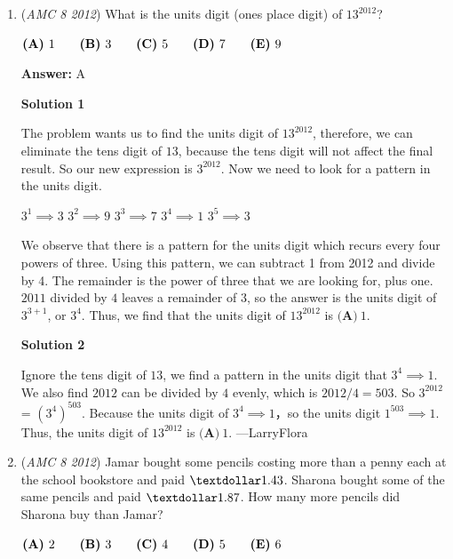 \begin{enumerate}
	\item (\textit{AMC 8 2012}) What is the units digit (ones place digit) of  $13^{2012}$?


 $\textbf{(A)}\hspace{.05in}1\qquad\textbf{(B)}\hspace{.05in}3\qquad\textbf{(C)}\hspace{.05in}5\qquad\textbf{(D)}\hspace{.05in}7\qquad\textbf{(E)}\hspace{.05in}9$

 \textbf{Answer: }A



\textbf{Solution 1}

The problem wants us to find the units digit of $13^{2012}$, therefore, we can eliminate the tens digit of $13$, because the tens digit will not affect the final result. So our new expression is $3^{2012}$. Now we need to look for a pattern in the units digit.

 $3^1 \implies 3$
$3^2 \implies 9$
$3^3 \implies 7$
$3^4 \implies 1$
$3^5 \implies 3$

 We observe that there is a pattern for the units digit which recurs every four powers of three. Using this pattern, we can subtract 1 from 2012 and divide by 4. The remainder is the power of three that we are looking for, plus one. $2011$ divided by $4$  leaves a remainder of $3$, so the answer is the units digit of $3^{3+1}$, or $3^4$. Thus, we find that the units digit of $13^{2012}$ is $\boxed{{\textbf{(A)}\ 1}}$.

 



\textbf{Solution 2}

Ignore the tens digit of $13$, we find a pattern in the units digit that $3^4 \implies 1$. We also find $2012$ can be divided by $4$ evenly, which is $2012/4=503$. So $3^{2012}$ = $(3^4)^{503}$. Because the units digit of $3^4 \implies 1$，so the units digit $1^{503} \implies 1$. Thus, the units digit of  $13^{2012}$ is $\boxed{{\textbf{(A)}\ 1}}$.   ---LarryFlora

 


	\item (\textit{AMC 8 2012}) Jamar bought some pencils costing more than a penny each at the school bookstore and paid $\textdollar 1.43$. Sharona bought some of the same pencils and paid $\textdollar 1.87$. How many more pencils did Sharona buy than Jamar?


 $\textbf{(A)}\hspace{.05in}2\qquad\textbf{(B)}\hspace{.05in}3\qquad\textbf{(C)}\hspace{.05in}4\qquad\textbf{(D)}\hspace{.05in}5\qquad\textbf{(E)}\hspace{.05in}6$


\end{enumerate}
